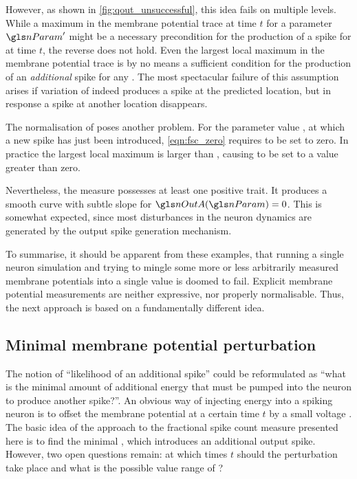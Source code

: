 However, as shown in \cref{fig:qout_unsuccessful}, this idea fails on multiple levels. While a maximum in the membrane potential trace at time $t$ for a parameter $\nParam'$ might be a necessary precondition for the production of a spike for \nParam at time $t$, the reverse does not hold. Even the largest local maximum in the membrane potential trace is by no means a sufficient condition for the production of an \emph{additional} spike for any \nParam. The most spectacular failure of this assumption arises if variation of \nParam indeed produces a spike at the predicted location, but in response a spike at another location disappears.

The normalisation of \pOutA poses another problem. For the parameter value \nParam, at which a new spike has just been introduced, \cref{eqn:fsc_zero} requires \pOutA to be set to zero. In practice the largest local maximum is larger than \El, causing \pOutA to be set to a value greater than zero.

Nevertheless, the measure possesses at least one positive trait. It produces a smooth curve with subtle slope for $\nOutA(\nParam) = 0$. This is somewhat expected, since most disturbances in the neuron dynamics are generated by the output spike generation mechanism.

To summarise, it should be apparent from these examples, that running a single neuron simulation and trying to mingle some more or less arbitrarily measured membrane potentials into a single value \pOutA is doomed to fail. Explicit membrane potential measurements are neither expressive, nor properly normalisable. Thus, the next approach is based on a fundamentally different idea.

\subsection{Minimal membrane potential perturbation}
The notion of \enquote{likelihood of an additional spike} could be reformulated as \enquote{what is the minimal amount of additional energy that must be pumped into the neuron to produce another spike?}. An obvious way of injecting energy into a spiking neuron is to offset the membrane potential at a certain time $t$ by a small voltage \pum. The basic idea of the approach to the fractional spike count measure presented here is to find the minimal \pum, which introduces an additional output spike. However, two open questions remain: at which times $t$ should the perturbation take place and what is the possible value range of \pum?

